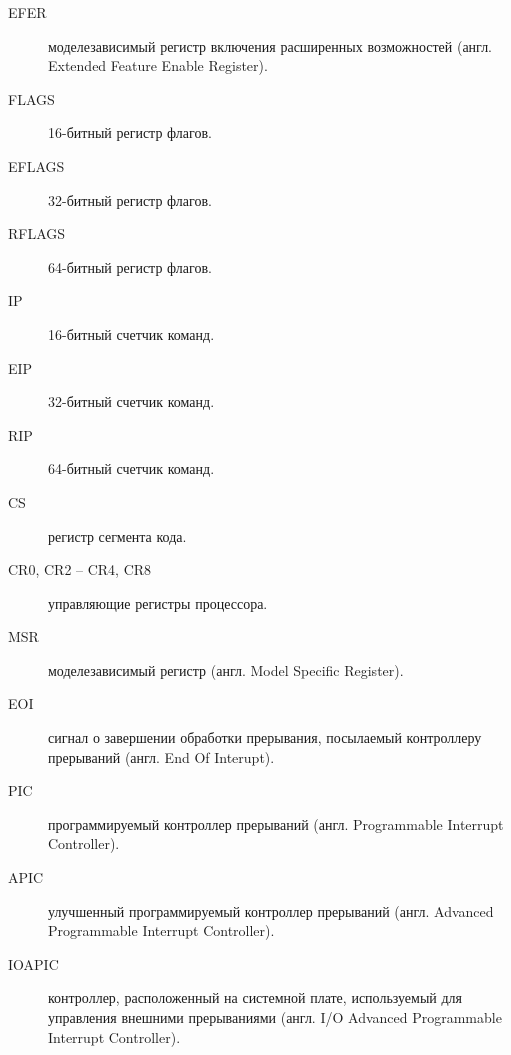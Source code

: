 \begin{description}
\item[EFER] моделезависимый регистр включения расширенных возможностей (англ. Extended Feature Enable Register).
\item[FLAGS] 16-битный регистр флагов.
\item[EFLAGS] 32-битный регистр флагов.
\item[RFLAGS] 64-битный регистр флагов.
\item[IP] 16-битный счетчик команд.
\item[EIP] 32-битный счетчик команд.
\item[RIP] 64-битный счетчик команд.
\item[CS] регистр сегмента кода.
\item[CR0, CR2 -- CR4, CR8] управляющие регистры процессора.
\item[MSR] моделезависимый регистр (англ. Model Specific Register).
\item[EOI] сигнал о завершении обработки прерывания, посылаемый
	контроллеру прерываний (англ. End Of Interupt).
\item[PIC] программируемый контроллер прерываний (англ. Programmable Interrupt Controller).
\item[APIC] улучшенный программируемый контроллер прерываний (англ. Advanced Programmable Interrupt Controller).
\item[IOAPIC] контроллер, расположенный на системной плате,
	используемый для управления внешними прерываниями (англ. I/O Advanced Programmable Interrupt Controller).
\end{description}

